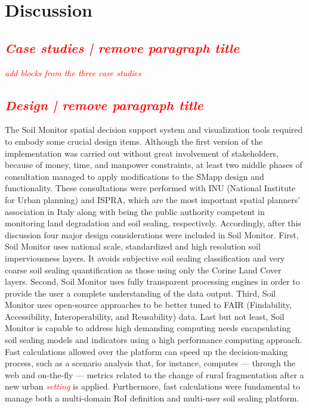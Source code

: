 \documentclass[APA,LATO1COL,doublespace]{WileyNJD-v2}
\newcommand{\toberevised}[1]{\emph{\textcolor{red}{#1}}} %
\begin{document}
\section{Discussion}
\subsection{ \toberevised{Case studies | remove paragraph title} }
\toberevised{add blocks from the three case studies}

\subsection{ \toberevised{Design | remove paragraph title} }
The Soil Monitor spatial decision support system and visualization tools required to embody some crucial design items. 
Although the first version of the implementation was carried out without great involvement of stakeholders, because of money, time, and manpower constraints, at least two middle phases of consultation managed to apply modifications to the SMapp design and functionality. 
These consultations were performed with INU (National Institute for Urban planning) and ISPRA, which are the most important spatial planners' association in Italy along with being the public authority competent in monitoring land degradation and soil sealing, respectively.
Accordingly, after this discussion four major design considerations were included in Soil Monitor.
First, Soil Monitor uses national scale, standardized and high resolution soil imperviousness layers.
It avoids subjective soil sealing classification and very coarse soil sealing quantification as those using only the Corine Land Cover layers.
Second, Soil Monitor uses fully transparent processing engines in order to provide the user a complete understanding of the data output.
Third, Soil Monitor uses open-source approaches to be better tuned to FAIR (Findability, Accessibility, Interoperability, and Reusability) data.
Last but not least, Soil Monitor is capable to address high demanding computing needs encapsulating soil sealing models and indicators using a high performance computing approach.
Fast calculations allowed over the platform can speed up the decision-making process, such as a scenario analysis that, for instance, computes --- through the web and on-the-fly --- metrics related to the change of rural fragmentation after a new urban \toberevised{setting} is applied.
Furthermore, fast calculations were fundamental to manage both a multi-domain RoI definition and multi-user soil sealing platform.
\end{document}
